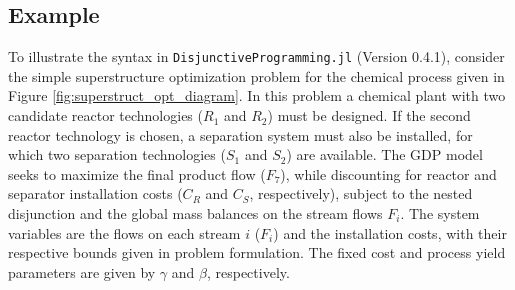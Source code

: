 \documentclass{juliacon}
\begin{document}
\subsection{Example}
To illustrate the syntax in \verb|DisjunctiveProgramming.jl| (Version 0.4.1), consider the simple superstructure optimization problem for the chemical process given in Figure \ref{fig:superstruct_opt_diagram}. In this problem a chemical plant with two candidate reactor technologies ($R_1$ and $R_2$) must be designed. If the second reactor technology is chosen, a separation system must also be installed, for which two separation technologies ($S_1$ and $S_2$) are available. The GDP model seeks to maximize the final product flow ($F_7$), while discounting for reactor and separator installation costs ($C_R$ and $C_S$, respectively), subject to the nested disjunction and the global mass balances on the stream flows $F_i$. The system variables are the flows on each stream $i$ ($F_i$) and the installation costs, with their respective bounds given in problem formulation. The fixed cost and process yield parameters are given by $\gamma$ and $\beta$, respectively.
\end{document}
